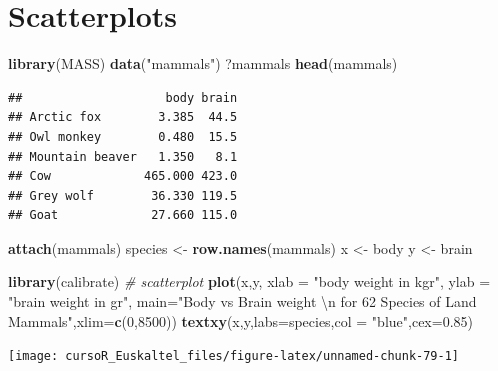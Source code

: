 \documentclass[]{book}
\newenvironment{Shaded}{\begin{snugshade}}{\end{snugshade}}
\newcommand{\KeywordTok}[1]{\textcolor[rgb]{0.13,0.29,0.53}{\textbf{#1}}}
\newcommand{\DataTypeTok}[1]{\textcolor[rgb]{0.13,0.29,0.53}{#1}}
\newcommand{\DecValTok}[1]{\textcolor[rgb]{0.00,0.00,0.81}{#1}}
\newcommand{\FloatTok}[1]{\textcolor[rgb]{0.00,0.00,0.81}{#1}}
\newcommand{\CharTok}[1]{\textcolor[rgb]{0.31,0.60,0.02}{#1}}
\newcommand{\StringTok}[1]{\textcolor[rgb]{0.31,0.60,0.02}{#1}}
\newcommand{\CommentTok}[1]{\textcolor[rgb]{0.56,0.35,0.01}{\textit{#1}}}
\newcommand{\NormalTok}[1]{#1}
\begin{document}
\section{Scatterplots}\label{scatterplots}

\begin{Shaded}
\begin{Highlighting}[]
\KeywordTok{library}\NormalTok{(MASS)}
\KeywordTok{data}\NormalTok{(}\StringTok{"mammals"}\NormalTok{)}
\NormalTok{?mammals}
\KeywordTok{head}\NormalTok{(mammals)}
\end{Highlighting}
\end{Shaded}

\begin{verbatim}
##                    body brain
## Arctic fox        3.385  44.5
## Owl monkey        0.480  15.5
## Mountain beaver   1.350   8.1
## Cow             465.000 423.0
## Grey wolf        36.330 119.5
## Goat             27.660 115.0
\end{verbatim}

\begin{Shaded}
\begin{Highlighting}[]
\KeywordTok{attach}\NormalTok{(mammals)}
\NormalTok{species <-}\StringTok{ }\KeywordTok{row.names}\NormalTok{(mammals)}
\NormalTok{x <-}\StringTok{ }\NormalTok{body}
\NormalTok{y <-}\StringTok{ }\NormalTok{brain}
\end{Highlighting}
\end{Shaded}

\begin{Shaded}
\begin{Highlighting}[]
\KeywordTok{library}\NormalTok{(calibrate)}
\CommentTok{# scatterplot}
\KeywordTok{plot}\NormalTok{(x,y, }\DataTypeTok{xlab =} \StringTok{"body weight in kgr"}\NormalTok{, }\DataTypeTok{ylab =} \StringTok{"brain weight in gr"}\NormalTok{, }
     \DataTypeTok{main=}\StringTok{"Body vs Brain weight }\CharTok{\textbackslash{}n}\StringTok{ for 62 Species of Land Mammals"}\NormalTok{,}\DataTypeTok{xlim=}\KeywordTok{c}\NormalTok{(}\DecValTok{0}\NormalTok{,}\DecValTok{8500}\NormalTok{))}
\KeywordTok{textxy}\NormalTok{(x,y,}\DataTypeTok{labs=}\NormalTok{species,}\DataTypeTok{col =} \StringTok{"blue"}\NormalTok{,}\DataTypeTok{cex=}\FloatTok{0.85}\NormalTok{) }
\end{Highlighting}
\end{Shaded}

\begin{center}\texttt{[image: cursoR\_Euskaltel\_files/figure-latex/unnamed-chunk-79-1]} \end{center}
\end{document}
